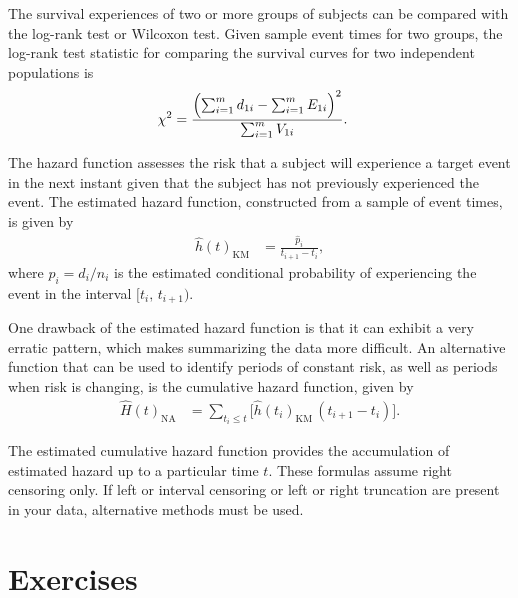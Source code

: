 \documentclass[
]{book}
\begin{document}
The survival experiences of two or more groups of subjects can be compared with the log-rank test or Wilcoxon test. Given sample event times for two groups, the log-rank test statistic for comparing the survival curves for two independent populations is
\begin{align}
\chi^2 &= \frac{\Bigl(\sum_{i=1}^m d_{1i} - \sum_{i=1}^m E_{1i}\Bigr)^2}
{\sum_{i=1}^m V_{1i}}.
\end{align}

The hazard function assesses the risk that a subject will experience a target event in the next instant given that the subject has not previously experienced the event. The estimated hazard function, constructed from a sample of event times, is given by
\begin{align}
\hat h(t)_{\mathrm{KM}} &= \frac{\hat p_i}{t_{i+1} - t_i},
\end{align}
where \(\hat p_i = d_i / n_i\) is the estimated conditional probability of experiencing the event in the interval \([t_i,\,t_{i+1})\).

One drawback of the estimated hazard function is that it can exhibit a very erratic pattern, which makes summarizing the data more difficult. An alternative function that can be used to identify periods of constant risk, as well as periods when risk is changing, is the cumulative hazard function, given by
\begin{align}
\widehat H(t)_{\mathrm{NA}}
&= \sum_{t_i \le t}
\bigl[\hat h(t_i)_{\mathrm{KM}}\,(t_{i+1} - t_i)\bigr].
\end{align}

The estimated cumulative hazard function provides the accumulation of estimated hazard up to a particular time \(t\). These formulas assume right censoring only. If left or interval censoring or left or right truncation are present in your data, alternative methods must be used.

\hypertarget{exercises-6}{%
\section{Exercises}\label{exercises-6}}
\end{document}
